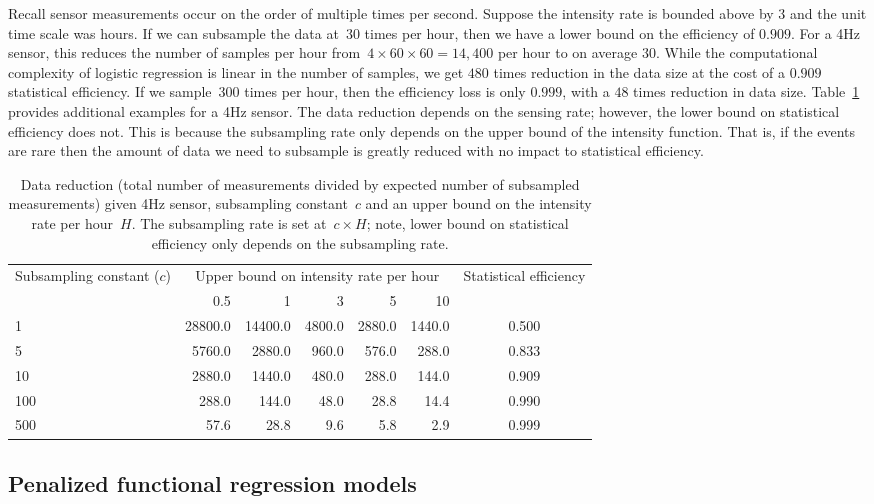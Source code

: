 \documentclass[12pt]{amsart}
\begin{document}
Recall sensor measurements occur on the order of multiple times per
second.  Suppose the intensity rate is bounded above by $3$ and the
unit time scale was hours. If we can subsample the data at~$30$
times per hour, then we have a lower bound on the efficiency of
$0.909$. For a 4Hz sensor, this reduces the number of samples per hour
from~$4 \times 60 \times 60 = 14,400$ per hour to on average $30$.
While the computational complexity of logistic regression is linear in
the number of samples, we get $480$ times reduction in the data size
at the cost of a $0.909$ statistical efficiency. If we sample~$300$
times per hour, then the efficiency loss is only $0.999$, with a $48$
times reduction in data size. Table~\ref{tab:compvseff} provides
additional examples for a 4Hz sensor.  The data reduction depends on
the sensing rate; however, the lower bound on statistical efficiency
does not.  This is because the subsampling rate only depends on the
upper bound of the intensity function. That is, if the events are rare
then the amount of data we need to subsample is greatly reduced with
no impact to statistical efficiency.

\begin{table}[!th]
\centering
\begin{tabular}{l r r r r r | c}
\multirow{2}{2.5cm}{Subsampling constant ($c$)} 
  & \multicolumn{5}{c}{Upper bound on intensity rate per
    hour} 
  & \multirow{2}{2cm}{Statistical efficiency}\\ \cline{2-6} 
& 0.5 & 1 & 3 & 5 & 10 \\ \hline
1 & 28800.0 & 14400.0 & 4800.0 & 2880.0 & 1440.0 & 0.500 \\
5 & 5760.0 & 2880.0 & 960.0 & 576.0 & 288.0 & 0.833 \\
10 & 2880.0 & 1440.0 & 480.0 & 288.0 & 144.0 & 0.909 \\
100 & 288.0 & 144.0 & 48.0 & 28.8 & 14.4 & 0.990 \\
500 & 57.6 & 28.8 & 9.6 & 5.8 & 2.9 & 0.999 \\ \hline
\end{tabular}
\caption{Data reduction (total number of measurements divided by
  expected number of subsampled measurements) given 4Hz sensor,
  subsampling constant~$c$ and an upper bound on the intensity
  rate per hour~$H$. The subsampling rate is set at~$c \times H$;
  note, lower bound on statistical efficiency only depends on the
  subsampling rate.}   
\label{tab:compvseff}
\end{table}

\subsection{Penalized functional regression models}
\end{document}
